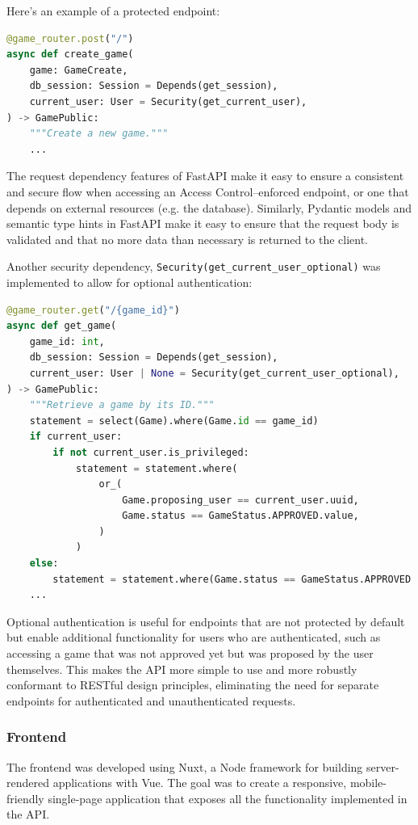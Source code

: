 \documentclass[11pt,italian,a4paper]{article}
\begin{document}
Here's an example of a protected endpoint:
\begin{lstlisting}[language=Python]
@game_router.post("/")
async def create_game(
    game: GameCreate,
    db_session: Session = Depends(get_session),
    current_user: User = Security(get_current_user),
) -> GamePublic:
    """Create a new game."""
    ...
\end{lstlisting}

The request dependency features of FastAPI make it easy to ensure a consistent and secure flow when accessing an Access Control--enforced endpoint, or one that depends on external resources (e.g. the database). Similarly, Pydantic models and semantic type hints in FastAPI make it easy to ensure that the request body is validated and that no more data than necessary is returned to the client.

Another security dependency, \texttt{Security(get\_current\_user\_optional)} was implemented to allow for optional authentication:

\begin{lstlisting}[language=Python]
@game_router.get("/{game_id}")
async def get_game(
    game_id: int,
    db_session: Session = Depends(get_session),
    current_user: User | None = Security(get_current_user_optional),
) -> GamePublic:
    """Retrieve a game by its ID."""
    statement = select(Game).where(Game.id == game_id)
    if current_user:
        if not current_user.is_privileged:
            statement = statement.where(
                or_(
                    Game.proposing_user == current_user.uuid,
                    Game.status == GameStatus.APPROVED.value,
                )
            )
    else:
        statement = statement.where(Game.status == GameStatus.APPROVED.value)
    ...
\end{lstlisting}

Optional authentication is useful for endpoints that are not protected by default but enable additional functionality for users who are authenticated, such as accessing a game that was not approved yet but was proposed by the user themselves. This makes the API more simple to use and more robustly conformant to RESTful design principles, eliminating the need for separate endpoints for authenticated and unauthenticated requests.

\subsubsection{Frontend}
The frontend was developed using Nuxt, a Node framework for building server-rendered applications with Vue. The goal was to create a responsive, mobile-friendly single-page application that exposes all the functionality implemented in the API.
\end{document}
